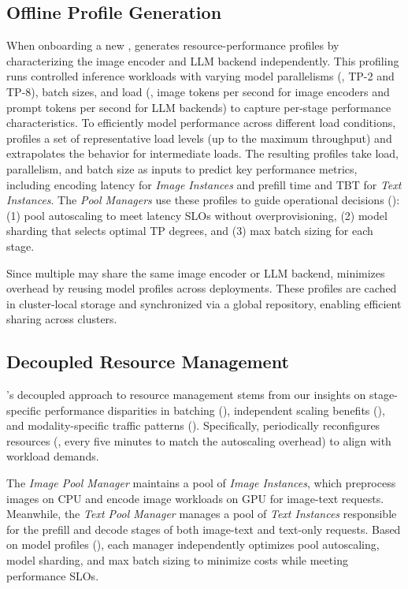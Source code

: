 \subsection{Offline \lmm{} Profile Generation}
\label{sec:design:profiling}
When onboarding a new \lmm{}, \sysname{} generates resource-performance profiles by characterizing the image encoder and LLM backend independently.
This profiling runs controlled inference workloads with varying model parallelisms (\eg{}, TP-2 and TP-8), batch sizes, and load (\ie{}, image tokens per second for image encoders and prompt tokens per second for LLM backends) to capture per-stage performance characteristics.
To efficiently model performance across different load conditions, \sysname{} profiles a set of representative load levels (up to the maximum throughput) and extrapolates the behavior for intermediate loads.
The resulting profiles take load, parallelism, and batch size as inputs to predict key performance metrics, including encoding latency for \emph{Image Instances} and prefill time and TBT for \emph{Text Instances}.
The \emph{Pool Managers} use these profiles to guide operational decisions ():
(1) pool autoscaling to meet latency SLOs without overprovisioning,
(2) model sharding that selects optimal TP degrees, and
(3) max batch sizing for each stage.

Since multiple \lmms{} may share the same image encoder or LLM backend, \sysname{} minimizes overhead by reusing model profiles across deployments.
These profiles are cached in cluster-local storage and synchronized via a global repository, enabling efficient sharing across clusters.


\subsection{Decoupled Resource Management}
\label{sec:design:resource-management}
\sysname{}'s decoupled approach to resource management stems from our insights on stage-specific performance disparities in batching (), independent scaling benefits (), and modality-specific traffic patterns ().
Specifically, \sysname{} periodically reconfigures resources (\ie{}, every five minutes to match the autoscaling overhead) to align with workload demands.

The \emph{Image Pool Manager} maintains a pool of \emph{Image Instances}, which preprocess images on CPU and encode image workloads on GPU for image-text requests.
Meanwhile, the \emph{Text Pool Manager} manages a pool of \emph{Text Instances} responsible for the prefill and decode stages of both image-text and text-only requests.
Based on model profiles (), each manager independently optimizes pool autoscaling, model sharding, and max batch sizing to minimize costs while meeting performance SLOs.

